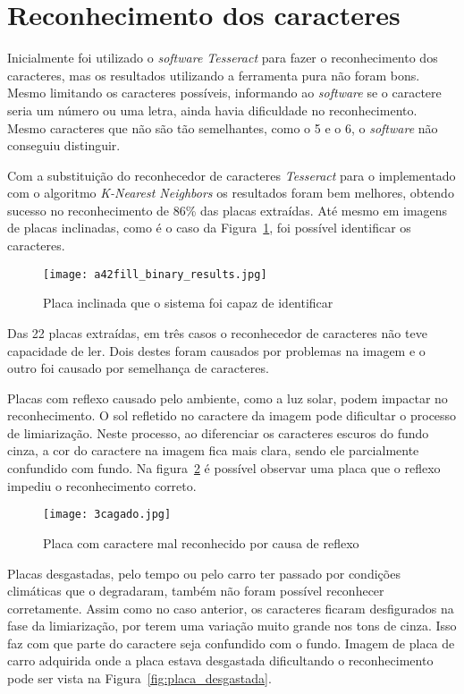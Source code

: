 \section{Reconhecimento dos caracteres}
\label{sec:reconhecimento_dos_caracteres_resultados}

Inicialmente foi utilizado o \emph{software Tesseract} para fazer o
reconhecimento dos caracteres, mas os resultados utilizando a ferramenta pura
não foram bons. Mesmo limitando os caracteres possíveis, informando ao
\emph{software} se o caractere seria um número ou uma letra, ainda havia
dificuldade no reconhecimento. Mesmo caracteres que não são tão semelhantes,
como o 5 e o 6, o \emph{software} não conseguiu distinguir.

Com a substituição do reconhecedor de caracteres \emph{Tesseract} para o
implementado com o algoritmo \emph{K-Nearest Neighbors} os resultados foram bem
melhores, obtendo sucesso no reconhecimento de 86\% das placas extraídas. Até
mesmo em imagens de placas inclinadas, como é o caso da
Figura~\ref{fig:plate_torta_result}, foi possível identificar os caracteres.

\begin{figure}[H]
	\centering
	\texttt{[image: a42fill\_binary\_results.jpg]}
	\caption{Placa inclinada que o sistema foi capaz de identificar}
	\label{fig:plate_torta_result}
\end{figure}

Das 22 placas extraídas, em três casos o reconhecedor de caracteres não teve
capacidade de ler. Dois destes foram causados por problemas na imagem e o outro
foi causado por semelhança de caracteres.

Placas com reflexo causado pelo ambiente, como a luz solar, podem impactar no
reconhecimento. O sol refletido no caractere da imagem pode dificultar o
processo de limiarização. Neste processo, ao diferenciar os caracteres escuros
do fundo cinza, a cor do caractere na imagem fica mais clara, sendo ele
parcialmente confundido com fundo. Na figura~\ref{fig:cagado_reflexo} é possível
observar uma placa que o reflexo impediu o reconhecimento correto.

\begin{figure}[H]
	\centering
	\texttt{[image: 3cagado.jpg]}
	\caption{Placa com caractere mal reconhecido por causa de reflexo}
	\label{fig:cagado_reflexo}
\end{figure}

Placas desgastadas, pelo tempo ou pelo carro ter passado por condições climáticas que o degradaram, também não foram possível reconhecer corretamente. Assim como no caso anterior, os caracteres ficaram desfigurados na fase da limiarização, por terem uma variação muito grande nos tons de cinza. Isso faz com que parte do caractere seja confundido com o fundo. Imagem de placa de carro adquirida onde a placa estava desgastada dificultando o reconhecimento pode ser vista na Figura~\ref{fig:placa_desgastada}.


